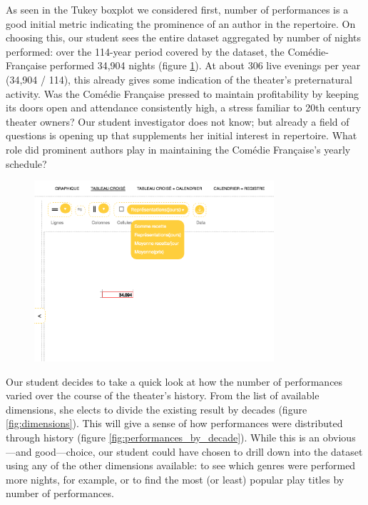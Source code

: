 \documentclass[	DIV=calc,%
							paper=a4,%
							fontsize=11pt,%
							twocolumn]{scrartcl}	 					%
\begin{document}
As seen in the Tukey boxplot we considered first, number of performances is a good initial metric indicating the prominence of an author in the repertoire.  On choosing this, our student sees the entire dataset aggregated by number of nights performed: over the 114-year period covered by the dataset, the Comédie-Française performed 34,904 nights (figure \ref{fig:opening}).  At about 306 live evenings per year (34,904 / 114), this already gives some indication of the theater’s preternatural activity.  Was the Comédie Française pressed to maintain profitability by keeping its doors open and attendance consistently high, a stress familiar to 20th century theater owners?  Our student investigator does not know; but already a field of questions is opening up that supplements her initial interest in repertoire.  What role did prominent authors play in maintaining the Comédie Française’s yearly schedule?

\begin{figure}
  \centering
	\includegraphics[width=3.5in]{steps/opening.png}
	\caption{}
	\label{fig:opening}
\end{figure}

Our student decides to take a quick look at how the number of performances varied over the course of the theater’s history.  From the list of available dimensions, she elects to divide the existing result by decades (figure \ref{fig:dimensions}).  This will give a sense of how performances were distributed through history (figure \ref{fig:performances_by_decade}).  While this is an obvious—and good—choice, our student could have chosen to drill down into the dataset using any of the other dimensions available: to see which genres were performed more nights, for example, or to find the most (or least) popular play titles by number of performances.
\end{document}
